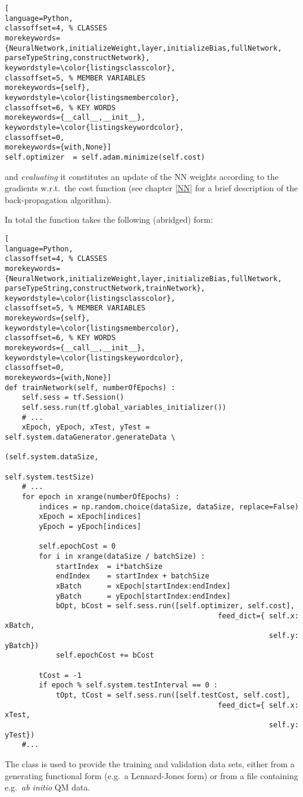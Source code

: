 \documentclass[../../master.tex]{subfiles}
\begin{document}
\begin{lstlisting}[
language=Python,
classoffset=4, % CLASSES
morekeywords={NeuralNetwork,initializeWeight,layer,initializeBias,fullNetwork, parseTypeString,constructNetwork},
keywordstyle=\color{listingsclasscolor},
classoffset=5, % MEMBER VARIABLES
morekeywords={self},
keywordstyle=\color{listingsmembercolor},
classoffset=6, % KEY WORDS
morekeywords={__call__,__init__},
keywordstyle=\color{listingskeywordcolor},
classoffset=0,
morekeywords={with,None}]
self.optimizer  = self.adam.minimize(self.cost)
\end{lstlisting}
and \emph{evaluating} it constitutes an update of the NN weights according to the gradients w.r.t.\ the cost function (see chapter \ref{NN} for a brief description of the back-propagation algorithm). 

In total the  function takes the following (abridged) form:
\begin{lstlisting}[
language=Python,
classoffset=4, % CLASSES
morekeywords={NeuralNetwork,initializeWeight,layer,initializeBias,fullNetwork, parseTypeString,constructNetwork,trainNetwork},
keywordstyle=\color{listingsclasscolor},
classoffset=5, % MEMBER VARIABLES
morekeywords={self},
keywordstyle=\color{listingsmembercolor},
classoffset=6, % KEY WORDS
morekeywords={__call__,__init__},
keywordstyle=\color{listingskeywordcolor},
classoffset=0,
morekeywords={with,None}]
def trainNetwork(self, numberOfEpochs) :
    self.sess = tf.Session()
    self.sess.run(tf.global_variables_initializer())
    # ...
    xEpoch, yEpoch, xTest, yTest = self.system.dataGenerator.generateData \
                                                          (self.system.dataSize,
                                                           self.system.testSize)
    # ...
    for epoch in xrange(numberOfEpochs) :
        indices = np.random.choice(dataSize, dataSize, replace=False)
        xEpoch = xEpoch[indices]
        yEpoch = yEpoch[indices]      

        self.epochCost = 0
        for i in xrange(dataSize / batchSize) :
            startIndex  = i*batchSize
            endIndex    = startIndex + batchSize
            xBatch      = xEpoch[startIndex:endIndex]
            yBatch      = yEpoch[startIndex:endIndex]
            bOpt, bCost = self.sess.run([self.optimizer, self.cost], 
                                                  feed_dict={ self.x: xBatch, 
                                                              self.y: yBatch})
            self.epochCost += bCost

        tCost = -1
        if epoch % self.system.testInterval == 0 :
            tOpt, tCost = self.sess.run([self.testCost, self.cost], 
                                                  feed_dict={ self.x: xTest, 
                                                              self.y: yTest})
    #...
\end{lstlisting}
The  class is used to provide the training and validation data sets, either from a generating functional form (e.g.\ a Lennard-Jones form) or from a file containing e.g.\ \emph{ab initio} QM data.
\end{document}
